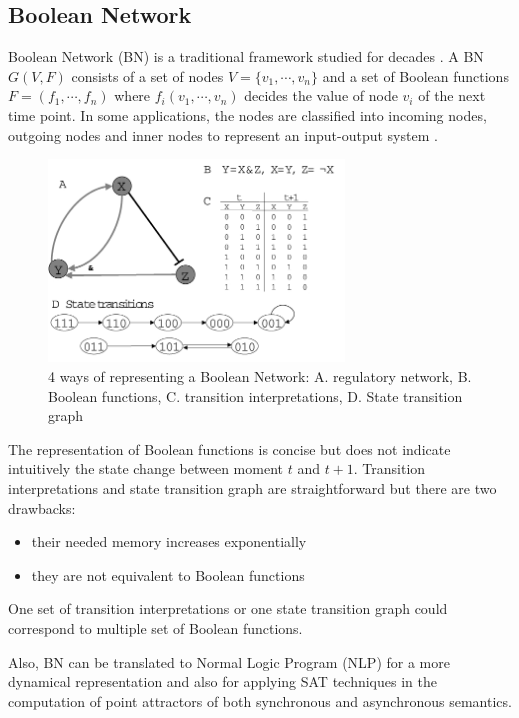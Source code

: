 \subsection{Boolean Network}
Boolean Network (BN) is a traditional framework studied for decades \cite{kauffman1969}.
A BN $G(V,F)$ consists of a set of nodes $V=\{v_1,\cdots,v_n\}$ and a set of Boolean functions $F=(f_1,\cdots,f_n)$ where $f_i(v_1,\cdots,v_n)$ decides the value of node $v_i$ of the next time point.
In some applications, the nodes are classified into incoming nodes, outgoing nodes and inner nodes to represent an input-output system \cite{akutsu2007control}.
\begin{figure}
    \centering
    \includegraphics[width=0.7\textwidth]{figures/BooleanNetwork.png}
    \caption[Boolean Network]{4 ways of representing a Boolean Network: A. regulatory network, B. Boolean functions, C. transition interpretations, D. State transition graph}
    \label{fig:booleannetwork}
\end{figure}

The representation of Boolean functions is concise but does not indicate intuitively the state change between moment $t$ and $t+1$.
Transition interpretations and state transition graph are straightforward but there are two drawbacks: 
\begin{itemize}
    \item their needed memory increases exponentially
    \item they are not equivalent to Boolean functions
\end{itemize}
One set of transition interpretations or one state transition graph could correspond to multiple set of Boolean functions.

Also, BN can be translated to Normal Logic Program (NLP) \cite{inoue2011logic} for a more dynamical representation and also for applying SAT techniques in the computation of point attractors of both synchronous and asynchronous semantics.

